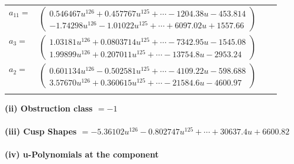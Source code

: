 \documentclass[1p]{elsarticle_modified}
\theoremstyle{definition}
\begin{document}
\begin{tabular}{m{7pt} m{180pt} m{7pt} m{180pt} }
\flushright $a_{11}=$&$\begin{pmatrix}0.546467 u^{126}+0.457767 u^{125}+\cdots-1204.38 u-453.814\\-1.74298 u^{126}-1.01022 u^{125}+\cdots+6097.02 u+1557.66\end{pmatrix}$ \\
\flushright $a_{3}=$&$\begin{pmatrix}1.03181 u^{126}+0.0803714 u^{125}+\cdots-7342.95 u-1545.08\\1.99899 u^{126}+0.207011 u^{125}+\cdots-13754.8 u-2953.24\end{pmatrix}$ \\
\flushright $a_{2}=$&$\begin{pmatrix}0.601134 u^{126}-0.502581 u^{125}+\cdots-4109.22 u-598.688\\3.57670 u^{126}+0.360615 u^{125}+\cdots-21584.6 u-4600.97\end{pmatrix}$\\&\end{tabular}
\flushleft \textbf{(ii) Obstruction class $= -1$}\\~\\
\flushleft \textbf{(iii) Cusp Shapes $= -5.36102 u^{126}-0.802747 u^{125}+\cdots+30637.4 u+6600.82$}\\~\\
\newpage\renewcommand{\arraystretch}{1}
\flushleft \textbf{(iv) u-Polynomials at the component}\newline \\
\end{document}
